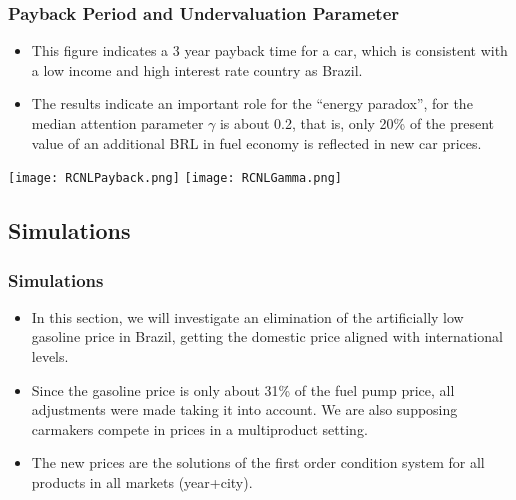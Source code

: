 \documentclass{beamer}
\begin{document}
\begin{frame}[fragile]\frametitle{Payback Period and Undervaluation Parameter}
    
\begin{itemize}
    \item This figure indicates a 3 year payback time for a car, which is consistent with a low income and high interest rate country as Brazil.
    \item The results indicate an important role for the ``energy paradox'', for the median attention parameter $\gamma$ is about 0.2, that is, only 20\% of the present value of an additional BRL in fuel economy is reflected in new car prices.
\end{itemize}
    
\texttt{[image: RCNLPayback.png]}%
\texttt{[image: RCNLGamma.png]}


\end{frame}

\subsection{Simulations}

\begin{frame}[fragile]\frametitle{Simulations}
    
    \begin{itemize}
        \item In this section, we will investigate an elimination of the artificially low gasoline price in Brazil, getting the domestic price aligned with international levels. 
        \item Since the gasoline price is only about 31\% of the fuel pump price, all adjustments were made taking it into account. We are also supposing carmakers compete in prices in a multiproduct setting. 
        \item The new prices are the solutions of the first order condition system for all products in all markets (year+city).
    \end{itemize}


\end{frame}
\end{document}
